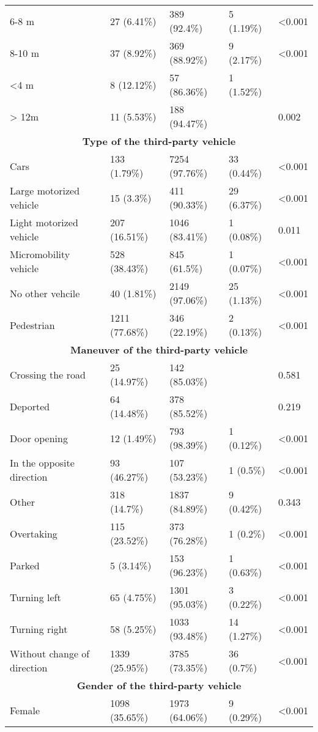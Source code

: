 \begin{longtable}{p{4.5cm}p{3cm}p{3cm}p{3cm}p{1.5cm}}
6-8 m & 27 (6.41\%) & 389 (92.4\%) & 5 (1.19\%) & <0.001  \\
8-10 m & 37 (8.92\%) & 369 (88.92\%) & 9 (2.17\%) & <0.001  \\
<4 m & 8 (12.12\%) & 57 (86.36\%) & 1 (1.52\%) &   \\
> 12m & 11 (5.53\%) & 188 (94.47\%) &  & 0.002  \\
\hline
\multicolumn{5}{c}{\textbf{Type of the third-party vehicle}} \\
Cars & 133 (1.79\%) & 7254 (97.76\%) & 33 (0.44\%) & <0.001  \\
Large motorized vehicle & 15 (3.3\%) & 411 (90.33\%) & 29 (6.37\%) & <0.001  \\
Light motorized vehicle & 207 (16.51\%) & 1046 (83.41\%) & 1 (0.08\%) & 0.011  \\
Micromobility vehicle & 528 (38.43\%) & 845 (61.5\%) & 1 (0.07\%) & <0.001  \\
No other vehcile & 40 (1.81\%) & 2149 (97.06\%) & 25 (1.13\%) & <0.001  \\
Pedestrian & 1211 (77.68\%) & 346 (22.19\%) & 2 (0.13\%) & <0.001  \\
\hline
\multicolumn{5}{c}{\textbf{Maneuver of the third-party vehicle}} \\
Crossing the road & 25 (14.97\%) & 142 (85.03\%) &  & 0.581  \\
Deported & 64 (14.48\%) & 378 (85.52\%) &  & 0.219  \\
Door opening & 12 (1.49\%) & 793 (98.39\%) & 1 (0.12\%) & <0.001  \\
In the opposite direction & 93 (46.27\%) & 107 (53.23\%) & 1 (0.5\%) & <0.001  \\
Other & 318 (14.7\%) & 1837 (84.89\%) & 9 (0.42\%) & 0.343  \\
Overtaking & 115 (23.52\%) & 373 (76.28\%) & 1 (0.2\%) & <0.001  \\
Parked & 5 (3.14\%) & 153 (96.23\%) & 1 (0.63\%) & <0.001  \\
Turning left & 65 (4.75\%) & 1301 (95.03\%) & 3 (0.22\%) & <0.001  \\
Turning right & 58 (5.25\%) & 1033 (93.48\%) & 14 (1.27\%) & <0.001  \\
Without change of direction & 1339 (25.95\%) & 3785 (73.35\%) & 36 (0.7\%) & <0.001  \\
\hline
\multicolumn{5}{c}{\textbf{Gender of the third-party vehicle}} \\
Female & 1098 (35.65\%) & 1973 (64.06\%) & 9 (0.29\%) & <0.001  \\

\end{longtable}

